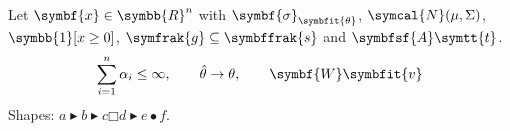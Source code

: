 \documentclass{article}
\begin{document}
Let $\symbf{x} \in \symbb{R}^n$ with $\symbf{\sigma}_{\symbfit{\theta}}$, $\symcal{N}(\mu, \Sigma)$, $\symbb{1}[x \geq 0]$, $\symfrak{g} \subseteq \symbffrak{s}$ and $\symbfsf{A} \symtt{t}$.
\[ \sum_{i=1}^{n} \alpha_i \leq \infty, \qquad \hat{\theta} \rightarrow \theta, \qquad \symbf{W} \symbfit{v} \]
Shapes: $a \smallblacktriangleright b \blacktriangleright c \mdlgwhtsquare d \blacktriangleright e \bullet f$.
\end{document}
